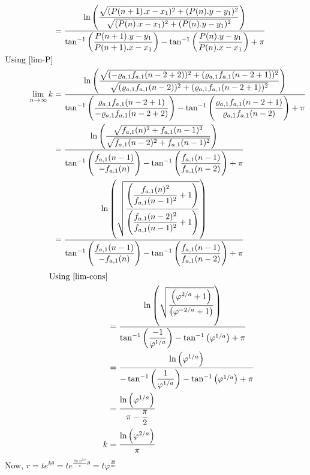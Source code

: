 \documentclass[preprint,12pt]{elsarticle}
\begin{document}
\begin{align*}
	                      & = \dfrac{\ln{\left(\dfrac{\sqrt{(P(n+1).x -x_1)^2 + (P(n).y - y_1)^2}}{\sqrt{(P(n).x -x_1)^2 + (P(n).y - y_1)^2}}\right)}}{\tan^{-1}\left({\dfrac{P(n+1).y - y_1}{P(n+1).x - x_1}}\right) - \tan^{-1}\left({\dfrac{P(n).y - y_1}{P(n).x - x_1}}\right)+ \pi}                                                                                                                   \\
	\text{Using \ref{lim-P}}\\
	\lim_{n \to \infty} k & = \dfrac{\ln{\left(\dfrac{\sqrt{(-\varrho_{a,1}f_{a,1}(n-2+2))^2 + (\varrho_{a,1}f_{a,1}(n-2+1))^2}}{\sqrt{(\varrho_{a,1}f_{a,1}(n-2))^2 + (\varrho_{a,1}f_{a,1}(n-2+1))^2}}\right)}}{\tan^{-1}\left({\dfrac{\varrho_{a,1}f_{a,1}(n-2+1)}{-\varrho_{a,1}f_{a,1}(n-2+2)}}\right) - \tan^{-1}\left({\dfrac{\varrho_{a,1}f_{a,1}(n-2+1)}{\varrho_{a,1}f_{a,1}(n-2)}}\right)+ \pi} \\
	                      & =\dfrac{\ln{\left(\dfrac{\sqrt{f_{a,1}(n)^2 + f_{a,1}(n-1)^2}}{\sqrt{f_{a,1}(n-2)^2 + f_{a,1}(n-1)^2}}\right)}}{\tan^{-1}\left({\dfrac{f_{a,1}(n-1)}{-f_{a,1}(n)}}\right) - \tan^{-1}\left({\dfrac{f_{a,1}(n-1)}{f_{a,1}(n-2)}}\right)+ \pi}                                                                                                                                   \\
	                      & =\dfrac{\ln{\left(\sqrt{\dfrac{\left(\dfrac{f_{a,1}(n)^2}{f_{a,1}(n-1)^2} +1\right)}{\left(\dfrac{f_{a,1}(n-2)^2}{f_{a,1}(n-1)^2}+1\right)}}\right)}}{\tan^{-1}\left({\dfrac{f_{a,1}(n-1)}{-f_{a,1}(n)}}\right) - \tan^{-1}\left({\dfrac{f_{a,1}(n-1)}{f_{a,1}(n-2)}}\right)+ \pi}                                                                                             
\end{align*}
\begin{align*}
	\text{Using \ref{lim-cons}}\\
	  & =\dfrac{\ln{\left(\sqrt{\dfrac{\left(\varphi^{2/a} +1\right)}{\left(\varphi^{-2/a}+1\right)}}\right)}}{\tan^{-1}\left({\dfrac{-1}{\varphi^{1/a}}}\right) - \tan^{-1}\left({\varphi^{1/a}}\right)+ \pi} \\
	  & =\dfrac{\ln{\left(\varphi^{1/a}\right)}}{-\tan^{-1}\left({\dfrac{1}{\varphi^{1/a}}}\right) - \tan^{-1}\left({\varphi^{1/a}}\right)+ \pi}                                                               \\
	  & =\dfrac{\ln{\left(\varphi^{1/a}\right)}}{\pi - \dfrac{\pi}{2}}                                                                                                                                         \\
	k & = \dfrac{\ln{\left(\varphi^{2/a}\right)}}{\pi}                                                                                                                                                         
\end{align*}
Now, 
{\large$r = te^{k\theta} = 
	te^{\frac{\ln{\varphi^{2/a}}}{\pi}\theta} = t\varphi^{\frac{2\theta}{a\pi}}$}
\end{document}
